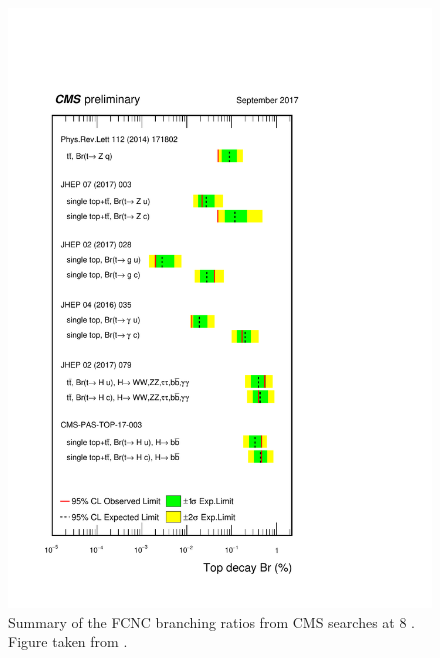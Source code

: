 \begin{figure}[htbp]
	\centering
	\includegraphics[width=1.\linewidth]{1_Introduction/Figures/summary_FCNC.pdf}
	\caption{Summary of the FCNC branching ratios from CMS searches at 8 \TeV. Figure taken from \cite{summarywiki}.}
	\label{fig:summaryfcnc}
\end{figure}




